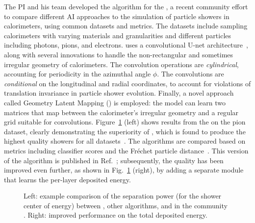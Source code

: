 The PI and his team developed the \diffu algorithm for the \challenge,
a recent community effort to compare different AI approaches to the simulation of particle showers in calorimeters, using common datasets and metrics.
The datasets include sampling calorimeters with varying materials and granularities and different particles including photons, pions, and electrons.
\diffu uses a convolutional U-net architecture~\cite{Ronneberger:2015}, along with several innovations to handle the non-rectangular and sometimes irregular geometry of calorimeters.
The convolution operations are \textit{cylindrical}, accounting for periodicity in the azimuthal angle $\phi$.
The convolutions are \textit{conditional} on the longitudinal and radial coordinates, to account for violations of translation invariance in particle shower evolution.
Finally, a novel approach called Geometry Latent Mapping (\glam) is employed:
the model can learn two matrices that map between the calorimeter's irregular geometry and a regular grid suitable for convolutions.
Figure~\ref{fig:calodiffu} (left) shows results from the \challenge on the pion dataset, clearly demonstrating the superiority of \diffu,
which is found to produce the highest quality showers for all datasets~\cite{Krause:2023mlj}.
The algorithms are compared based on metrics including classifier scores and the Fr\'echet particle distance~\cite{Kansal:2022spb}.
This version of the algorithm is published in Ref.~\cite{Amram:2023onf};
subsequently, the quality has been improved even further, as shown in Fig.~\ref{fig:calodiffu} (right), by adding a separate module that learns the per-layer deposited energy.

\begin{figure}[htb!]
\centering
{}
\caption{Left: example comparison of the separation power (for the shower center of energy) between \diffu, other algorithms, and \GEANTfour in the community \challenge.
Right: improved \diffu performance on the total deposited energy.}
\label{fig:calodiffu}
\end{figure}

